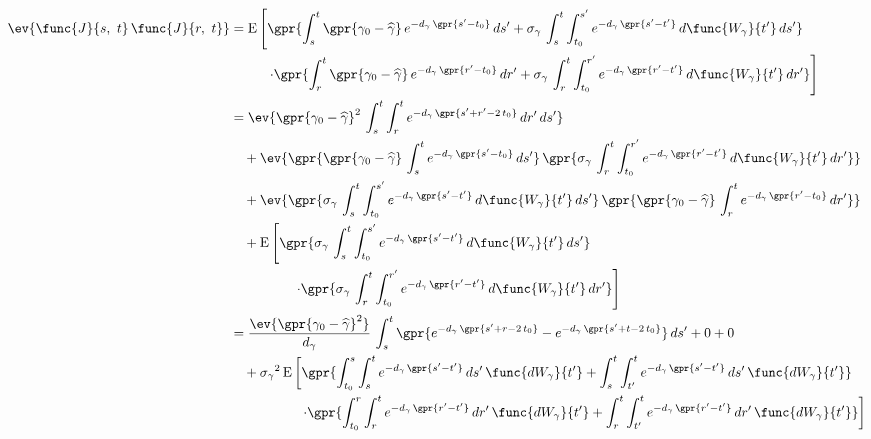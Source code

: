 \begin{align}
    \ev{\func{J}{s,\ t}\,\func{J}{r,\ t}} &= \text{E}\left[ \gpr{\int_{s}^{t} \gpr{\gamma_0 - \widehat{\gamma}}\,e^{-d_{\gamma}\,\gpr{s' - t_0}}\,ds' + \sigma_{\gamma}\,\int_{s}^{t} \int_{t_0}^{s'} e^{-d_{\gamma}\,\gpr{s' - t'}}\,d\func{W_{\gamma}}{t'}\,ds'} \right. \\
    		&\phantom{\text{E}}\qquad \left. \cdot \gpr{\int_{r}^{t} \gpr{\gamma_0 - \widehat{\gamma}}\,e^{-d_{\gamma}\,\gpr{r' - t_0}}\,dr' + \sigma_{\gamma}\,\int_{r}^{t} \int_{t_0}^{r'} e^{-d_{\gamma}\,\gpr{r' - t'}}\,d\func{W_{\gamma}}{t'}\,dr'} \right] \nonumber \\
    	&= \ev{\gpr{\gamma_0 - \widehat{\gamma}}^2\,\int_{s}^{t} \int_{r}^{t} e^{-d_{\gamma}\,\gpr{s' + r' - 2\,t_0}}\,dr'\,ds'} \nonumber \\
    		&\quad + \ev{\gpr{\gpr{\gamma_0 - \widehat{\gamma}}\,\int_{s}^{t} e^{-d_{\gamma}\,\gpr{s' - t_0}}\,ds'}\,\gpr{\sigma_{\gamma}\,\int_{r}^{t} \int_{t_0}^{r'} e^{-d_{\gamma}\,\gpr{r' - t'}}\,d\func{W_{\gamma}}{t'}\,dr'}} \nonumber \\
    		&\quad + \ev{\gpr{\sigma_{\gamma}\,\int_{s}^{t} \int_{t_0}^{s'} e^{-d_{\gamma}\,\gpr{s' - t'}}\,d\func{W_{\gamma}}{t'}\,ds'}\,\gpr{\gpr{\gamma_0 - \widehat{\gamma}}\,\int_{r}^{t} e^{-d_{\gamma}\,\gpr{r' - t_0}}\,dr'}} \nonumber \\
    		&\quad + \text{E}\left[\gpr{\sigma_{\gamma}\,\int_{s}^{t} \int_{t_0}^{s'} e^{-d_{\gamma}\,\gpr{s' - t'}}\,d\func{W_{\gamma}}{t'}\,ds'} \right. \nonumber \\
    		&\phantom{\text{E}}\qquad\qquad \left. \cdot \gpr{\sigma_{\gamma}\,\int_{r}^{t} \int_{t_0}^{r'} e^{-d_{\gamma}\,\gpr{r' - t'}}\,d\func{W_{\gamma}}{t'}\,dr'} \right] \nonumber \\
    	&= \frac{\ev{\gpr{\gamma_0 - \widehat{\gamma}}^2}}{d_{\gamma}}\,\int_{s}^{t} \gpr{e^{-d_{\gamma}\,\gpr{s' + r - 2\,t_0}} - e^{-d_{\gamma}\,\gpr{s' + t - 2\,t_0}}}\,ds' + 0 + 0 \nonumber \\
    		&\quad + {\sigma_{\gamma}}^2\,\text{E}\left[ \gpr{\int_{t_{0}}^{s} \int_{s}^{t} e^{-d_{\gamma}\,\gpr{s' - t'}}\,ds'\,\func{d{W}_{\gamma}}{t'} + \int_{s}^{t} \int_{t'}^{t} e^{-d_{\gamma}\,\gpr{s' - t'}}\,ds'\,\func{d{W}_{\gamma}}{t'}} \right. \nonumber \\
    		&\phantom{+ {\sigma_{\gamma}}^2\,\text{E}}\qquad \left. \cdot \gpr{\int_{t_{0}}^{r} \int_{r}^{t} e^{-d_{\gamma}\,\gpr{r' - t'}}\,dr'\,\func{d{W}_{\gamma}}{t'} + \int_{r}^{t} \int_{t'}^{t} e^{-d_{\gamma}\,\gpr{r' - t'}}\,dr'\,\func{d{W}_{\gamma}}{t'}} \right] \nonumber \\

\end{align}
